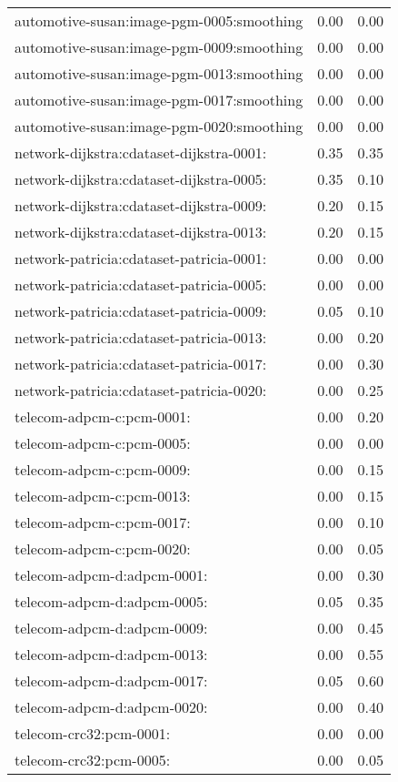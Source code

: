 \begin{longtable}{lrr}
automotive-susan:image-pgm-0005:smoothing & 0.00 & 0.00 \\
automotive-susan:image-pgm-0009:smoothing & 0.00 & 0.00 \\
automotive-susan:image-pgm-0013:smoothing & 0.00 & 0.00 \\
automotive-susan:image-pgm-0017:smoothing & 0.00 & 0.00 \\
automotive-susan:image-pgm-0020:smoothing & 0.00 & 0.00 \\
network-dijkstra:cdataset-dijkstra-0001: & 0.35 & 0.35 \\
network-dijkstra:cdataset-dijkstra-0005: & 0.35 & 0.10 \\
network-dijkstra:cdataset-dijkstra-0009: & 0.20 & 0.15 \\
network-dijkstra:cdataset-dijkstra-0013: & 0.20 & 0.15 \\
network-patricia:cdataset-patricia-0001: & 0.00 & 0.00 \\
network-patricia:cdataset-patricia-0005: & 0.00 & 0.00 \\
network-patricia:cdataset-patricia-0009: & 0.05 & 0.10 \\
network-patricia:cdataset-patricia-0013: & 0.00 & 0.20 \\
network-patricia:cdataset-patricia-0017: & 0.00 & 0.30 \\
network-patricia:cdataset-patricia-0020: & 0.00 & 0.25 \\
telecom-adpcm-c:pcm-0001: & 0.00 & 0.20 \\
telecom-adpcm-c:pcm-0005: & 0.00 & 0.00 \\
telecom-adpcm-c:pcm-0009: & 0.00 & 0.15 \\
telecom-adpcm-c:pcm-0013: & 0.00 & 0.15 \\
telecom-adpcm-c:pcm-0017: & 0.00 & 0.10 \\
telecom-adpcm-c:pcm-0020: & 0.00 & 0.05 \\
telecom-adpcm-d:adpcm-0001: & 0.00 & 0.30 \\
telecom-adpcm-d:adpcm-0005: & 0.05 & 0.35 \\
telecom-adpcm-d:adpcm-0009: & 0.00 & 0.45 \\
telecom-adpcm-d:adpcm-0013: & 0.00 & 0.55 \\
telecom-adpcm-d:adpcm-0017: & 0.05 & 0.60 \\
telecom-adpcm-d:adpcm-0020: & 0.00 & 0.40 \\
telecom-crc32:pcm-0001: & 0.00 & 0.00 \\
telecom-crc32:pcm-0005: & 0.00 & 0.05 \\

\end{longtable}
